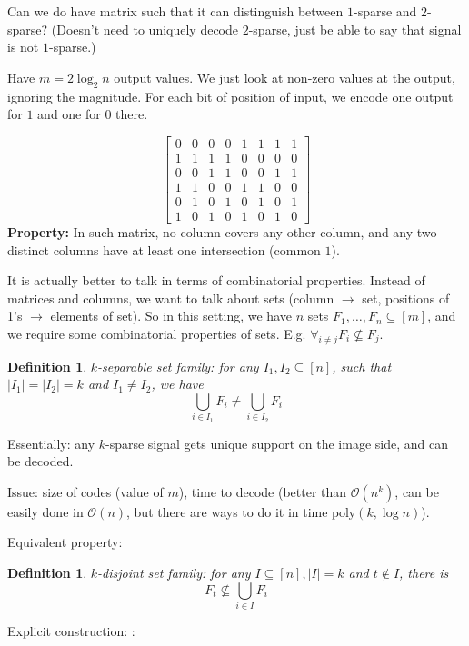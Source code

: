 \documentclass[11pt]{article}
\newtheorem{definition}[theorem]{Definition}
\newcommand{\bigo}{\mathcal{O}}
\begin{document}
{Can we do have matrix such that it can distinguish between $1$-sparse and $2$-sparse? (Doesn't need to uniquely decode $2$-sparse, just be able to say that signal is not $1$-sparse.)

Have $m = 2 \log_2 n$ output values. We just look at non-zero values at the output, ignoring the magnitude. For each bit of position of input, we encode one output for $1$ and one for $0$ there.

$$\begin{bmatrix} 0 & 0 & 0 & 0 & 1 & 1 & 1 & 1 \\ 1 & 1 & 1 & 1 &  0 & 0 & 0 & 0 \\  0 & 0 & 1 & 1 & 0 & 0 & 1 & 1 \\ 1 & 1 & 0 & 0 & 1 & 1 & 0 & 0  \\ 0 & 1 & 0 & 1 & 0 & 1 & 0 & 1 \\ 1 & 0 & 1 & 0 & 1 & 0 & 1 & 0 \end{bmatrix}
$$
\textbf{Property:} In such matrix, no column covers any other column, and any two distinct columns have at least one intersection (common $1$).


It is actually better to talk in terms of combinatorial properties. Instead of matrices and columns, we want to talk about sets (column $\to$ set, positions of 1's $\to$ elements of set).
So in this setting, we have $n$ sets $F_1,\ldots,F_n \subseteq [m]$, and we require some combinatorial properties of sets. E.g. $\forall_{i\not=j} F_i \not\subseteq F_j$.

\begin{definition}
$k$-separable set family: for any $I_1,I_2 \subseteq [n]$, such that $|I_1| = |I_2| = k$ and $I_1 \not= I_2$, we have
$$ \bigcup_{i \in I_1} F_i \not= \bigcup_{i \in I_2} F_i$$
\end{definition}

Essentially: any $k$-sparse signal gets unique support on the image side, and can be decoded.

Issue: size of codes (value of $m$), time to decode (better than $\bigo(n^k)$, can be easily done in $\bigo(n)$, but there are ways to do it in time $\textrm{poly}(k,\log n)$).

Equivalent property: 
\begin{definition}
$k$-disjoint set family:
for any $I \subseteq [n], |I| = k$ and $t \not\in I$, there is 
$$F_t \not\subseteq \bigcup_{i \in I} F_i$$
\end{definition}

Explicit construction: \cite{doi:reed-solomon}:

}
\end{document}
